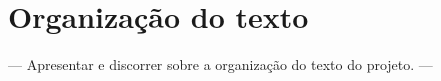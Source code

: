 
\section{Organização do texto}

 — Apresentar e discorrer sobre a 
 organização do texto do projeto. — 

